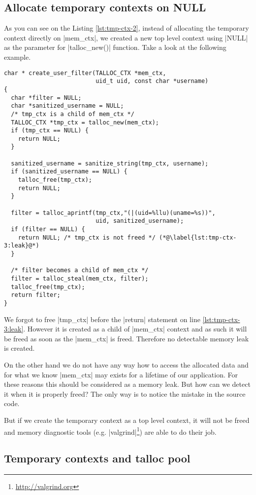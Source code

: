 \subsection{Allocate temporary contexts on NULL}
\label{talloc:subsec:tmp-ctx-on-null}

As you can see on the Listing \ref{lst:tmp-ctx-2}, instead of allocating the
temporary context directly on |mem_ctx|, we created a new top level context
using |NULL| as the parameter for |talloc_new()| function. Take a look at the
following example.

\begin{lstlisting}[caption={Temporary context \#3},label=lst:tmp-ctx-3]
char * create_user_filter(TALLOC_CTX *mem_ctx,
                          uid_t uid, const char *username)
{
  char *filter = NULL;
  char *sanitized_username = NULL;
  /* tmp_ctx is a child of mem_ctx */
  TALLOC_CTX *tmp_ctx = talloc_new(mem_ctx);
  if (tmp_ctx == NULL) {
    return NULL;
  }
  
  sanitized_username = sanitize_string(tmp_ctx, username);
  if (sanitized_username == NULL) {
    talloc_free(tmp_ctx);
    return NULL;
  }
  
  filter = talloc_aprintf(tmp_ctx,"(|(uid=%llu)(uname=%s))",
                          uid, sanitized_username);
  if (filter == NULL) {
    return NULL; /* tmp_ctx is not freed */ (*@\label{lst:tmp-ctx-3:leak}@*)
  }
  
  /* filter becomes a child of mem_ctx */
  filter = talloc_steal(mem_ctx, filter);
  talloc_free(tmp_ctx);
  return filter;
}
\end{lstlisting}

We forgot to free |tmp_ctx| before the |return| statement on line
\ref{lst:tmp-ctx-3:leak}. However it is created as a child of |mem_ctx| context
and as such it will be freed as soon as the |mem_ctx| is freed. Therefore no
detectable memory leak is created.

On the other hand we do not have any way how to access the allocated data
and for what we know |mem_ctx| may exists for a lifetime of our application.
For these reasons this should be considered as a memory leak. But how can we
detect it when it is properly freed? The only way is to notice the mistake in
the source code.

But if we create the temporary context as a top level context, it will not be
freed and memory diagnostic tools
(e.g. |valgrind|\footnote{\url{http://valgrind.org}}) are able to do their job.

\subsection{Temporary contexts and talloc pool}
\label{talloc:subsec:tmp-ctx-and-pool}

